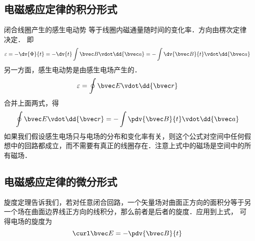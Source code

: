 

\subsection{电磁感应定律的积分形式}

闭合线圈产生的感生电动势%
等于线圈内磁通量随时间的变化率．方向由楞次定律%
决定． 即
\begin{equation}
\varepsilon  =  -\dv{\Phi}{t} =  - \dv{t} \int \bvec B \vdot \dd{\bvec a} =  - \int \dv{\bvec B}{t} \vdot \dd{\bvec a}
\end{equation} 
另一方面，感生电动势是由感生电场产生的． 
\begin{equation}
\varepsilon  = \oint \bvec E \vdot \dd{\bvec r}
\end{equation} 
合并上面两式，得
\begin{equation}
\oint \bvec E \vdot \dd{\bvec r}  =  - \int \pdv{\bvec B}{t} \vdot \dd{\bvec a} 
\end{equation} 
如果我们假设感生电场只与电场的分布和变化率有关，则这个公式对空间中任何假想中的回路都成立，而不需要有真正的线圈存在．注意上式中的磁场是空间中的所有磁场． 
\subsection{电磁感应定律的微分形式}

旋度定理告诉我们，若对任意闭合回路，一个矢量场对曲面正方向的面积分等于另一个场在曲面边界线正方向的线积分，那么前者是后者的旋度．应用到上式， 可得电场的旋度为
\begin{equation}
\curl \bvec E =  - \pdv{\bvec B}{t}
\end{equation} 

